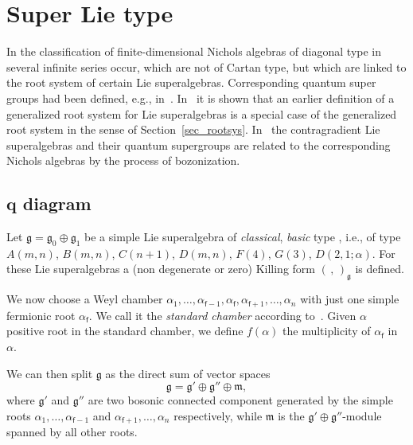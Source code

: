 \documentclass[pdftex]{sigma}%
\numberwithin{equation}{section}
\newcommand{\f}{\mathsf{f}}
\begin{document}
\section{Super Lie type}\label{SuperLie}

In the classification of finite-dimensional Nichols algebras of diagonal type in~\cite{Heck07} several infinite series occur, which are not of Cartan type, but which are linked to the root system of certain Lie superalgebras. Corresponding quantum super groups had been defined, e.g., in~\cite{KT91}. In~\cite[Example~9 and Theorem~24]{HY08} it is shown that an earlier definition of a generalized root system for Lie superalgebras \cite{Ser96} is a special case of the generalized root system in the sense of Section~\ref{sec_rootsys}. In~\cite{AAY11} the contragradient Lie superalgebras and their quantum supergroups are related to the corresponding Nichols algebras by the process of bozonization.

\subsection[$q$ diagram]{$\boldsymbol{q}$ diagram}

Let $\mathfrak{g} = \mathfrak{g_0} \oplus \mathfrak{g_1}$ be a simple Lie superalgebra of \emph{classical}, \emph{basic} type \cite{FSS96}, i.e., of type $A(m, n)$, $B(m, n)$, $C(n + 1)$, $D(m, n)$, $F(4)$, $G(3)$, $D(2, 1; \alpha)$. For these Lie superalgebras a (non degenerate or zero) Killing form $(\, ,\,)_\mathfrak{g} $ is defined.

We now choose a Weyl chamber $ \alpha_1, \dots, \alpha_{\f-1}, \alpha_\f,  \alpha_{\f+1}, \dots, \alpha_{n}$ with just one simple fermionic root $\alpha_\f$. We call it the \emph{standard chamber} according to~\cite{Kac77}. Given $\alpha$ positive root in the standard chamber, we define $f(\alpha)$ the multiplicity of $\alpha_\f$ in $\alpha$.

We can then split $\mathfrak{g}$ as the direct sum of vector spaces
\[\mathfrak{g} = \mathfrak{g'} \oplus \mathfrak{g''} \oplus \mathfrak{m},\]
where $\mathfrak{g'}$ and $\mathfrak{g''}$ are two bosonic connected component generated by the simple roots $ \alpha_1, \dots, \alpha_{\f-1}$ and $ \alpha_{\f+1}, \dots, \alpha_{n}$ respectively, while $\mathfrak{m}$ is the $\mathfrak{g'} \oplus \mathfrak{g''}$-module spanned by all other roots.
\end{document}
